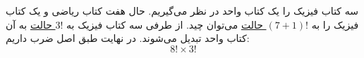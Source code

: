 \p
         سه کتاب فیزیک را یک کتاب واحد در نظر می‌گیریم. حال هفت کتاب ریاضی و یک کتاب فیزیک را به
         \underline{$(7+1)!$ حالت}
          می‌توان چید.
        از طرفی سه کتاب فیزیک به 
        \underline{$3!$ حالت}
         به آن کتاب واحد تبدیل می‌شوند.
        در نهایت طبق اصل ضرب داریم:       
        $$8!\times3!$$ 
        
